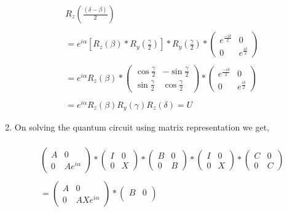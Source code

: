 \documentclass[a4paper,12pt]{article}
\begin{document}
\begin{enumerate}[label=(\alph*)]
\begin{gather*}
    R_z(\frac{(\delta - \beta)}{2})\\~\\
    =e^{i\alpha}[R_z(\beta)*R_y(\frac{\gamma}{2})] * R_y(\frac{\gamma}{2}) *  \begin{pmatrix}
e^\frac{-i\delta}{2} & 0 \\
0 & e^\frac{i\delta}{2}
\end{pmatrix}\\~\\
=  e^{i\alpha}R_z(\beta) * \begin{pmatrix}
\cos{\frac{\gamma}{2}} & -\sin{\frac{\gamma}{2}} \\
\sin{\frac{\gamma}{2}} & \cos{\frac{\gamma}{2}}
\end{pmatrix}* \begin{pmatrix}
e^\frac{-i\delta}{2} & 0 \\
0 & e^\frac{i\delta}{2}
\end{pmatrix}\\~\\
=  e^{i\alpha}R_z(\beta)R_y(\gamma)R_z(\delta) =U
\end{gather*}
\item On solving the quantum circuit using matrix representation we get,
\\~\\
\begin{gather*}
\begin{pmatrix}
A & 0 \\
0 & Ae^{i\alpha}
\end{pmatrix} * \begin{pmatrix}
I & 0 \\
0 & X
\end{pmatrix} *\begin{pmatrix}
B & 0 \\
0 & B
\end{pmatrix} *\begin{pmatrix}
I & 0 \\
0 & X
\end{pmatrix} *\begin{pmatrix}
C & 0 \\
0 & C
\end{pmatrix}\\~\\
= \begin{pmatrix}
A & 0 \\
0 & AXe^{i\alpha}
\end{pmatrix}* \begin{pmatrix}
B & 0 \\

\end{pmatrix}
\end{gather*}
\end{enumerate}
\end{document}
